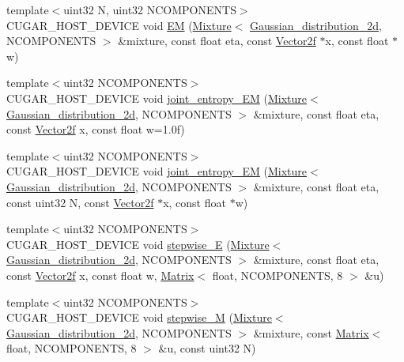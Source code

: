\begin{DoxyCompactItemize}
{\footnotesize template$<$uint32 N, uint32 N\+C\+O\+M\+P\+O\+N\+E\+N\+TS$>$ }\\C\+U\+G\+A\+R\+\_\+\+H\+O\+S\+T\+\_\+\+D\+E\+V\+I\+CE void \hyperlink{group___expectation_maximization_module_ga64c58392bf17c4bf5c654e1f508f9850}{EM} (\hyperlink{structcugar_1_1_mixture}{Mixture}$<$ \hyperlink{structcugar_1_1_gaussian__distribution__2d}{Gaussian\+\_\+distribution\+\_\+2d}, N\+C\+O\+M\+P\+O\+N\+E\+N\+TS $>$ \&mixture, const float eta, const \hyperlink{structcugar_1_1_vector}{Vector2f} $\ast$x, const float $\ast$w)
\item 
{\footnotesize template$<$uint32 N\+C\+O\+M\+P\+O\+N\+E\+N\+TS$>$ }\\C\+U\+G\+A\+R\+\_\+\+H\+O\+S\+T\+\_\+\+D\+E\+V\+I\+CE void \hyperlink{group___expectation_maximization_module_gaeb4d0f1ac6a25feb55e2433477ab8670}{joint\+\_\+entropy\+\_\+\+EM} (\hyperlink{structcugar_1_1_mixture}{Mixture}$<$ \hyperlink{structcugar_1_1_gaussian__distribution__2d}{Gaussian\+\_\+distribution\+\_\+2d}, N\+C\+O\+M\+P\+O\+N\+E\+N\+TS $>$ \&mixture, const float eta, const \hyperlink{structcugar_1_1_vector}{Vector2f} x, const float w=1.\+0f)
\item 
{\footnotesize template$<$uint32 N\+C\+O\+M\+P\+O\+N\+E\+N\+TS$>$ }\\C\+U\+G\+A\+R\+\_\+\+H\+O\+S\+T\+\_\+\+D\+E\+V\+I\+CE void \hyperlink{group___expectation_maximization_module_ga25d3aceabebc1f90ef6a8e0f2a50d24d}{joint\+\_\+entropy\+\_\+\+EM} (\hyperlink{structcugar_1_1_mixture}{Mixture}$<$ \hyperlink{structcugar_1_1_gaussian__distribution__2d}{Gaussian\+\_\+distribution\+\_\+2d}, N\+C\+O\+M\+P\+O\+N\+E\+N\+TS $>$ \&mixture, const float eta, const uint32 N, const \hyperlink{structcugar_1_1_vector}{Vector2f} $\ast$x, const float $\ast$w)
\item 
{\footnotesize template$<$uint32 N\+C\+O\+M\+P\+O\+N\+E\+N\+TS$>$ }\\C\+U\+G\+A\+R\+\_\+\+H\+O\+S\+T\+\_\+\+D\+E\+V\+I\+CE void \hyperlink{group___expectation_maximization_module_ga3504464ade0e67e978a8f8a91eb20f6b}{stepwise\+\_\+E} (\hyperlink{structcugar_1_1_mixture}{Mixture}$<$ \hyperlink{structcugar_1_1_gaussian__distribution__2d}{Gaussian\+\_\+distribution\+\_\+2d}, N\+C\+O\+M\+P\+O\+N\+E\+N\+TS $>$ \&mixture, const float eta, const \hyperlink{structcugar_1_1_vector}{Vector2f} x, const float w, \hyperlink{structcugar_1_1_matrix}{Matrix}$<$ float, N\+C\+O\+M\+P\+O\+N\+E\+N\+TS, 8 $>$ \&u)
\item 
{\footnotesize template$<$uint32 N\+C\+O\+M\+P\+O\+N\+E\+N\+TS$>$ }\\C\+U\+G\+A\+R\+\_\+\+H\+O\+S\+T\+\_\+\+D\+E\+V\+I\+CE void \hyperlink{group___expectation_maximization_module_ga53b8d4d4e5fe664aa12144c359034b35}{stepwise\+\_\+M} (\hyperlink{structcugar_1_1_mixture}{Mixture}$<$ \hyperlink{structcugar_1_1_gaussian__distribution__2d}{Gaussian\+\_\+distribution\+\_\+2d}, N\+C\+O\+M\+P\+O\+N\+E\+N\+TS $>$ \&mixture, const \hyperlink{structcugar_1_1_matrix}{Matrix}$<$ float, N\+C\+O\+M\+P\+O\+N\+E\+N\+TS, 8 $>$ \&u, const uint32 N)

\end{DoxyCompactItemize}
